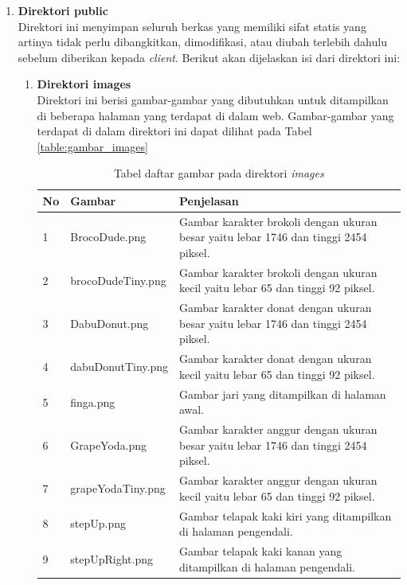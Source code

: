 \begin{enumerate}
	\item \textbf{Direktori public} \\
	Direktori ini menyimpan seluruh berkas yang memiliki sifat statis yang artinya tidak perlu dibangkitkan, dimodifikasi, atau diubah terlebih dahulu sebelum diberikan kepada \textit{client}. Berikut akan dijelaskan isi dari direktori ini:
	\begin{enumerate}
		\item \textbf{Direktori images} \\
		Direktori ini berisi gambar-gambar yang dibutuhkan untuk ditampilkan di beberapa halaman yang terdapat di dalam web. Gambar-gambar yang terdapat di dalam direktori ini dapat dilihat pada Tabel \ref{table:gambar_images}
		\begin{table}[H]
			\centering
			\caption{Tabel daftar gambar pada direktori \textit{images}}
			\begin{tabular}{|p{0.35cm}|p{4cm}|p{7cm}|}
				\hline
				No & Gambar & Penjelasan \\ \hline
				1 & BrocoDude.png & Gambar karakter brokoli dengan ukuran besar yaitu lebar 1746 dan tinggi 2454 piksel. \\ \hline
				2 & brocoDudeTiny.png & Gambar karakter brokoli dengan ukuran kecil yaitu lebar 65 dan tinggi 92 piksel. \\ \hline
				3 & DabuDonut.png & Gambar karakter donat dengan ukuran besar yaitu lebar 1746 dan tinggi 2454 piksel. \\ \hline
				4 & dabuDonutTiny.png & Gambar karakter donat dengan ukuran kecil yaitu lebar 65 dan tinggi 92 piksel. \\ \hline
				5 & finga.png & Gambar jari yang ditampilkan di halaman awal. \\ \hline
				6 & GrapeYoda.png & Gambar karakter anggur dengan ukuran besar yaitu lebar 1746 dan tinggi 2454 piksel. \\ \hline
				7 & grapeYodaTiny.png & Gambar karakter anggur dengan ukuran kecil yaitu lebar 65 dan tinggi 92 piksel. \\ \hline
				8 & stepUp.png & Gambar telapak kaki kiri yang ditampilkan di halaman pengendali. \\ \hline
				9 & stepUpRight.png & Gambar telapak kaki kanan yang ditampilkan di halaman pengendali. \\ \hline

\end{tabular}
\end{table}
\end{enumerate}
\end{enumerate}
